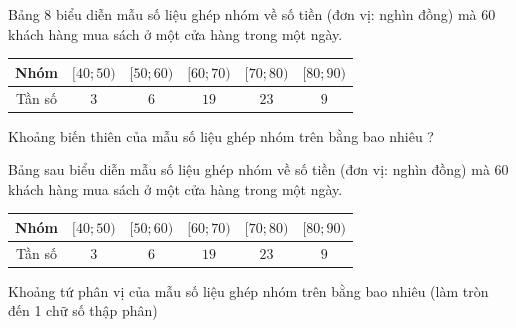 \begin{bt}%

	Bảng $8$ biểu diễn mẫu số liệu ghép nhóm về số tiền (đơn vị: nghìn đồng) mà $60$ khách hàng mua sách ở một cửa hàng trong một ngày.
	\begin{center}
		\begin{tabular}{|c|c|c|c|c|c|}
	\hline Nhóm  &$[40 ; 50)$ & {$[50 ; 60)$} & {$[60 ; 70)$} &	{$[70 ; 80)$} &	{$[80 ; 90)$} \\
	\hline Tần số & $3$ & $6$ & $19$ & $23$ &$9$\\
	\hline
\end{tabular}
	\end{center}
Khoảng biến thiên của mẫu số liệu ghép nhóm trên bằng bao nhiêu ?
\end{bt}

\begin{bt}%

	Bảng sau biểu diễn mẫu số liệu ghép nhóm về số tiền (đơn vị: nghìn đồng) mà $60$ khách hàng mua sách ở một cửa hàng trong một ngày.
	\begin{center}
		\begin{tabular}{|c|c|c|c|c|c|}
			\hline Nhóm  &$[40 ; 50)$ & {$[50 ; 60)$} & {$[60 ; 70)$} &	{$[70 ; 80)$} &	{$[80 ; 90)$} \\
			\hline Tần số & $3$ & $6$ & $19$ & $23$ &$9$\\
			\hline
		\end{tabular}
	\end{center}
	Khoảng tứ phân vị của mẫu số liệu ghép nhóm trên bằng bao nhiêu (làm tròn đến 1 chữ số thập phân)
\end{bt}

